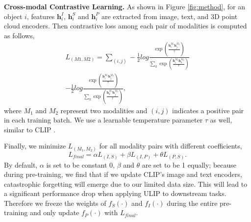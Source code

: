 \documentclass[10pt,twocolumn,letterpaper]{article}
\begin{document}
\noindent\textbf{Cross-modal Contrastive Learning.}
As shown in Figure \ref{fig:method}, for an object $i$, features $\mathbf{h}^I_i$, $\mathbf{h}^S_i$ and $\mathbf{h}^P_i$ are extracted from image, text, and 3D point cloud encoders. Then contrastive loss among each pair of modalities is computed as follows, 
\begin{equation}
\begin{aligned}
 L_{(M1, M2)} =
   \sum_{(i,j)}-\frac{1}{2}log\frac{\exp\left(\frac{\mathbf{h}^{M_1}_i \mathbf{h}^{M_2}_j}{\tau}\right)}{\sum_k \exp\left(\frac{\mathbf{h}^{M_1}_i \mathbf{h}^{M_2}_k}{\tau}\right)} \\-\frac{1}{2}
    log\frac{\exp\left(\frac{\mathbf{h}^{M_1}_i \mathbf{h}^{M_2}_j}{\tau}\right)}{\sum_k \exp\left(\frac{\mathbf{h}^{M_1}_k \mathbf{h}^{M_2}_j}{\tau}\right)},
\end{aligned}
\end{equation}
where $M_1$ and $M_2$ represent two modalities and $(i, j)$ indicates a positive pair in each training batch. We use a learnable temperature parameter $\tau$ as well, similar to CLIP \cite{radford2021learning}.

Finally, we minimize $ L_{(M_1, M_2)}$ for all modality pairs with different coefficients, 
\begin{equation}
 \label{eq:final loss}
   L_{final} = \alpha L_{(I,S)}+ \beta L_{(I,P)} + \theta L_{(P,S)}.
\end{equation}
By default, $\alpha$ is set to be constant 0, $\beta$ and $\theta$ are set to be 1 equally; because during pre-training, we find that if we update CLIP's image and text encoders, catastrophic forgetting will emerge due to our limited data size. This will lead to a significant performance drop when applying ULIP to downstream tasks. Therefore we freeze the weights of $f_S(\cdot)$ and $f_I(\cdot)$ during the entire pre-training and only update $f_P(\cdot)$ with $L_{final}$.
\end{document}
